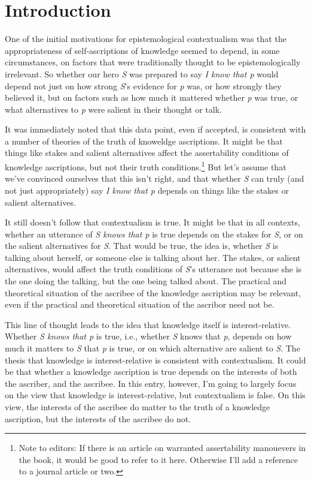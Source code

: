 \def\mytitle{Interest-Relative Invariantism}
\def\shorttitle{Interest-Relative Invariantism}
\def\myauthor{Brian Weatherson}
\def\latexmode{Book}


\section{Introduction}
\label{introduction}

One of the initial motivations for epistemological contextualism was that the appropriateness of self-ascriptions of knowledge seemed to depend, in some circumstances, on factors that were traditionally thought to be epistemologically irrelevant. So whether our hero \emph{S} was prepared to say \emph{I know that p} would depend not just on how strong \emph{S}'s evidence for \emph{p} was, or how strongly they believed it, but on factors such as how much it mattered whether \emph{p} was true, or what alternatives to \emph{p} were salient in their thought or talk.

It was immediately noted that this data point, even if accepted, is consistent with a number of theories of the truth of knoweldge ascriptions. It might be that things like stakes and salient alternatives affect the assertability conditions of knowledge ascriptions, but not their truth conditions.\footnote{Note to editors: If there is an article on warranted assertability manouevers in the book, it would be good to refer to it here. Otherwise I'll add a reference to a journal article or two.} But let's assume that we've convinced ourselves that this isn't right, and that whether \emph{S} can truly (and not just appropriately) say \emph{I know that p} depends on things like the stakes or salient alternatives.

It still doesn't follow that contextualism is true. It might be that in all contexts, whether an utterance of \emph{S knows that p} is true depends on the stakes for \emph{S}, or on the salient alternatives for \emph{S}. That would be true, the idea is, whether \emph{S} is talking about herself, or someone else is talking about her. The stakes, or salient alternatives, would affect the truth conditions of \emph{S}'s utterance not because she is the one doing the talking, but the one being talked about. The practical and theoretical situation of the ascribee of the knowledge ascription may be relevant, even if the practical and theoretical situation of the ascribor need not be.

This line of thought leads to the idea that knowledge itself is interest-relative. Whether \emph{S knows that p} is true, i.e., whether \emph{S} knows that \emph{p}, depends on how much it matters to \emph{S} that \emph{p} is true, or on which alternative are salient to \emph{S}. The thesis that knowledge is interest-relative is consistent with contextualism. It could be that whether a knowledge ascription is true depends on the interests of both the ascriber, and the ascribee. In this entry, however, I'm going to largely focus on the view that knowledge is interest-relative, but contextualism is false. On this view, the interests of the ascribee do matter to the truth of a knowledge ascription, but the interests of the ascribee do not.

